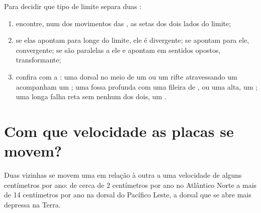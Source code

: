 \begin{method}\label{met:g7:plate-tectonics:recognise}
Para decidir que tipo de limite separa duas :
\begin{enumerate}
  \item encontre, num  dos movimentos das , as setas dos dois
        lados do limite;
  \item se elas apontam para longe do limite, ele é divergente; se apontam
        para ele, convergente; se são paralelas a ele e apontam em sentidos
        opostos, transformante;
  \item confira com a : uma dorsal no meio de um  ou um rifte
        atravessando um  acompanham um ; uma
        fossa profunda com uma fileira de , ou uma  alta,
        um ; uma longa falha reta sem nenhum dos dois, um
        .
\end{enumerate}
\end{method}

\section{Com que velocidade as placas se movem?}

\begin{proposition}\label{prop:g7:plate-tectonics:speed}
Duas  vizinhas se movem uma em relação à outra a uma velocidade de
alguns centímetros por ano: de cerca de 2 centímetros por ano no Atlântico
Norte a mais de 14 centímetros por ano na dorsal do Pacífico Leste, a
dorsal que se abre mais depressa na Terra.
\end{proposition}

